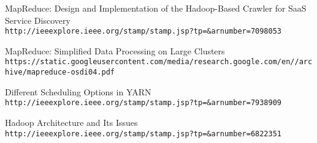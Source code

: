 \begin{thebibliography}{9}

MapReduce: Design and Implementation of the Hadoop-Based Crawler for SaaS Service Discovery
\\\texttt{http://ieeexplore.ieee.org/stamp/stamp.jsp?tp=\&arnumber=7098053}

MapReduce: Simplified Data Processing on Large Clusters
\\\texttt{https://static.googleusercontent.com/media/research.google.com/en//archive/mapreduce-osdi04.pdf}

Different Scheduling Options in YARN
\\\texttt{http://ieeexplore.ieee.org/stamp/stamp.jsp?tp=\&arnumber=7938909}

Hadoop Architecture and Its Issues
\\\texttt{http://ieeexplore.ieee.org/stamp/stamp.jsp?tp=\&arnumber=6822351}

\end{thebibliography}

